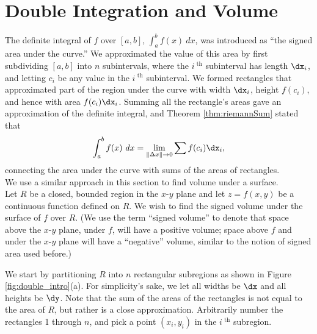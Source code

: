 \section{Double Integration and Volume}\label{sec:double_int_volume}

The definite integral of $f$ over $[a,b]$, $\int_a^b f(x)\ dx$, was introduced as ``the signed area under the curve.'' We approximated the value of this area by first subdividing $[a,b]$ into $n$ subintervals, where the $i^\text{ th}$ subinterval has length $\dx_i$, and letting $c_i$ be any value in the $i^\text{ th}$ subinterval. We formed rectangles that approximated part of the region under the curve with width $\dx_i$, height $f(c_i)$, and hence with area $f(c_i)\dx_i$. Summing all the rectangle's areas gave an approximation of the definite integral, and Theorem \ref{thm:riemannSum} stated that
$$\int_a^bf(x)\ dx = \lim_{\|\Delta x\|\to 0}\sum f(c_i)\dx_i,$$
connecting the area under the curve with sums of the areas of rectangles.\\

We use a similar approach in this section to find volume under a surface.\\

Let $R$ be a closed, bounded region in the $x$-$y$ plane and let $z=f(x,y)$ be a continuous function defined on $R$. We wish to find the signed volume under the surface of $f$ over $R$. (We use the term ``signed volume'' to denote that space above the $x$-$y$ plane, under $f$, will have a positive volume; space above $f$ and under the $x$-$y$ plane will have a ``negative'' volume, similar to the notion of signed area used before.)

We start by partitioning $R$ into $n$ rectangular subregions as shown in Figure \ref{fig:double_intro}(a). For simplicity's sake, we let all widths be $\dx$ and all heights be $\dy$. Note that the sum of the areas of the rectangles is not equal to the area of $R$, but rather is a close approximation. Arbitrarily number the rectangles 1 through $n$, and pick a point $(x_i,y_i)$ in the $i^\text{ th}$ subregion. 

